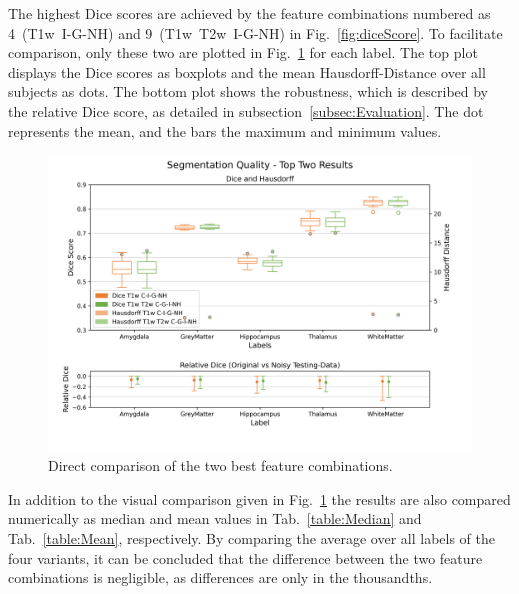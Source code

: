 \documentclass[conference]{IEEEtran}
\begin{document}
The highest Dice scores are achieved by the feature combinations numbered as 4~(T1w~I-G-NH) and 9~(T1w~T2w~I-G-NH) in Fig.~\ref{fig:diceScore}. To facilitate comparison, only these two are plotted in Fig.~\ref{fig:bestRun} for each label. The top plot displays the Dice scores as boxplots and the mean Hausdorff-Distance over all subjects as dots. The bottom plot shows the robustness, which is described by the relative Dice score, as detailed in subsection~\ref{subsec:Evaluation}. The dot represents the mean, and the bars the maximum and minimum values.

\begin{figure}[h!]
  \centering
  \includegraphics[width=0.8\linewidth, trim={0 8mm 0 10mm}, clip]{04_T1W_C_I_G_NH_and_09_T1W_T2W_C_I_G_NH_zoomed}
  \caption{Direct comparison of the two best feature combinations.}
  \label{fig:bestRun}
\end{figure}

In addition to the visual comparison given in Fig.~\ref{fig:bestRun} the results are also compared numerically as median and mean values in Tab.~\ref{table:Median} and Tab.~\ref{table:Mean}, respectively. By comparing the average over all labels of the four variants, it can be concluded that the difference between the two feature combinations is negligible, as differences are only in the thousandths.
\end{document}
